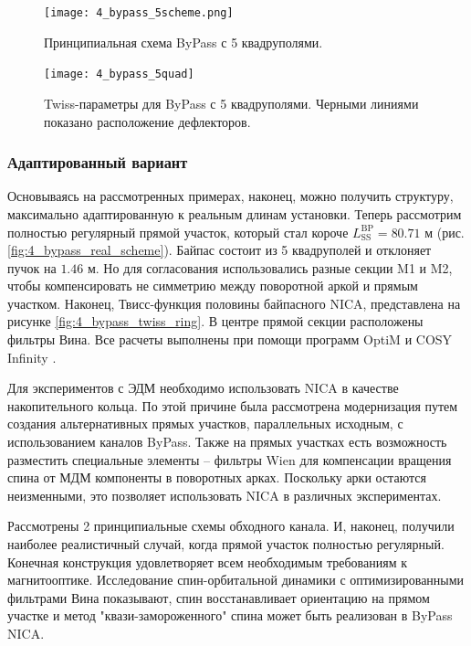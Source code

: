 \begin{figure}[!h]
  \centering
   \texttt{[image: 4\_bypass\_5scheme.png]}
   \caption{Принципиальная схема ByPass с 5 квадруполями.}
   \label{fig:4_bypass_5scheme}
\end{figure}

\begin{figure}[!h]
  \centering
   \texttt{[image: 4\_bypass\_5quad]}
   \caption{Twiss-параметры для ByPass с 5 квадруполями. Черными линиями показано расположение дефлекторов.}
   \label{fig:4_bypass_5quad}
\end{figure}

\subsubsection{Адаптированный вариант}\label{sec:EDM/Wien_filter/ByPass/final}

\par Основываясь на рассмотренных примерах, наконец, можно получить структуру, максимально адаптированную к реальным длинам установки. Теперь рассмотрим полностью регулярный прямой участок, который стал короче $L_{\textrm{SS}}^{\textrm{BP}}=80.71$ м (рис. \ref{fig:4_bypass_real_scheme}). Байпас состоит из 5 квадруполей и отклоняет пучок на $1.46$ м. Но для согласования использовались разные секции M1 и M2, чтобы компенсировать не симметрию между поворотной аркой и прямым участком. Наконец, Твисс-функция половины байпасного NICA, представлена на рисунке \ref{fig:4_bypass_twiss_ring}. В центре прямой секции расположены фильтры Вина. Все расчеты выполнены при помощи программ OptiM \cite{optim} и COSY Infinity \cite{cosy}.

\par Для экспериментов с ЭДМ необходимо использовать NICA в качестве накопительного кольца. По этой причине была рассмотрена модернизация путем создания альтернативных прямых участков, параллельных исходным, с использованием каналов ByPass. Также на прямых участках есть возможность разместить специальные элементы – фильтры Wien для компенсации вращения спина от МДМ компоненты в поворотных арках. Поскольку арки остаются неизменными, это позволяет использовать NICA в различных экспериментах.
\par Рассмотрены 2 принципиальные схемы обходного канала. И, наконец, получили наиболее реалистичный случай, когда прямой участок полностью регулярный. Конечная конструкция удовлетворяет всем необходимым требованиям к магнитооптике. Исследование спин-орбитальной динамики с оптимизированными фильтрами Вина показывают, спин восстанавливает ориентацию на прямом участке и метод "квази-замороженного" спина может быть реализован в ByPass NICA.

